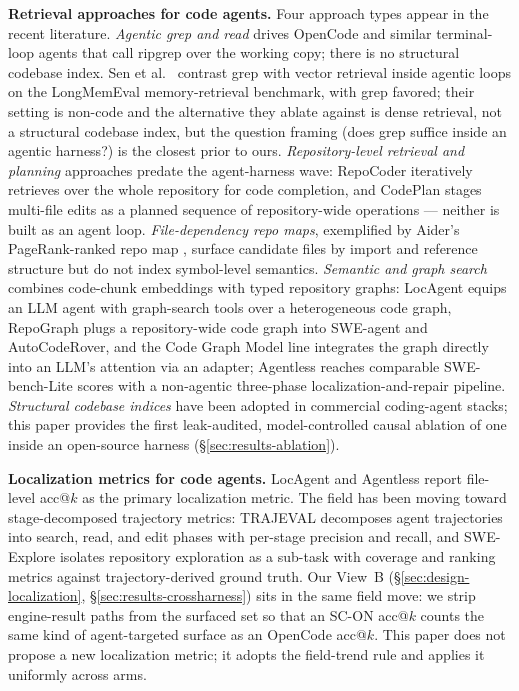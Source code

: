 \textbf{Retrieval approaches for code agents.} Four approach types appear in the recent
literature. \emph{Agentic grep and read} drives OpenCode \citep{opencode2025} and similar
terminal-loop agents that call ripgrep over the working copy; there is no structural
codebase index. Sen et al.\ \citep{grepallyouneed2026} contrast grep with vector retrieval
inside agentic loops on the LongMemEval memory-retrieval benchmark, with grep favored;
their setting is non-code and the alternative they ablate against is dense retrieval, not
a structural codebase index, but the question framing (does grep suffice inside an
agentic harness?) is the closest prior to ours. \emph{Repository-level retrieval and
planning} approaches predate the agent-harness wave: RepoCoder \citep{repocoder2023}
iteratively retrieves over the whole repository for code completion, and CodePlan
\citep{codeplan2024} stages multi-file edits as a planned sequence of repository-wide
operations --- neither is built as an agent loop. \emph{File-dependency repo maps},
exemplified by Aider's PageRank-ranked repo map
\citep{aider}, surface candidate files by import and reference structure but do not index
symbol-level semantics. \emph{Semantic and graph search} combines code-chunk embeddings
with typed repository graphs: LocAgent \citep{locagent2025} equips an LLM agent with
graph-search tools over a heterogeneous code graph, RepoGraph \citep{repograph2024} plugs
a repository-wide code graph into SWE-agent and AutoCodeRover, and the Code Graph Model
line \citep{cgm2025} integrates the graph directly into an LLM's attention via an
adapter; Agentless \citep{agentless2024} reaches comparable SWE-bench-Lite scores with a
non-agentic three-phase localization-and-repair pipeline. \emph{Structural codebase
indices} have been adopted in commercial coding-agent stacks; this paper provides the
first leak-audited, model-controlled causal ablation of one inside an open-source harness
(\S\ref{sec:results-ablation}).

\textbf{Localization metrics for code agents.} LocAgent \citep{locagent2025} and
Agentless \citep{agentless2024} report file-level acc@$k$ as the primary localization
metric. The field has been moving toward stage-decomposed trajectory metrics: TRAJEVAL
\citep{trajeval2026} decomposes agent trajectories into search, read, and edit phases
with per-stage precision and recall, and SWE-Explore \citep{sweexplore2026} isolates
repository exploration as a sub-task with coverage and ranking metrics against
trajectory-derived ground truth. Our View~B
(\S\ref{sec:design-localization}, \S\ref{sec:results-crossharness}) sits in the same
field move: we strip engine-result paths from the surfaced set so that an SC-ON acc@$k$
counts the same kind of agent-targeted surface as an OpenCode acc@$k$. This paper does
not propose a new localization metric; it adopts the field-trend rule and applies it
uniformly across arms.


